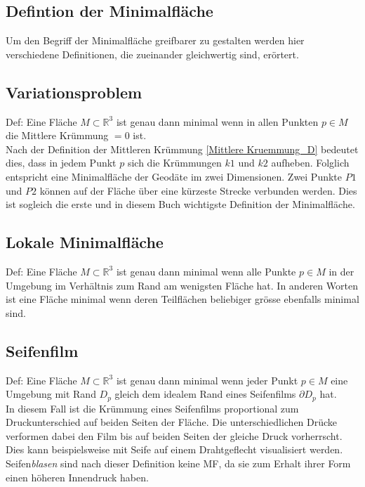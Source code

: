 \begin{refsection}
\section{Defintion der Minimalfläche}
Um den Begriff der Minimalfläche greifbarer zu gestalten werden hier verschiedene Definitionen, die zueinander gleichwertig sind, erörtert.

\subsection{Variationsproblem}\label{Variationsproblem}
Def: Eine Fläche $ \textit{M} \subset \mathbb{R}^{3} $ ist genau dann minimal wenn in allen Punkten $p \in M$ die Mittlere Krümmung $=0$ ist.\\
Nach der Definition der Mittleren Krümmung \eqref{Mittlere Kruemmung_D} bedeutet dies, dass in jedem Punkt $p$ sich die Krümmungen $k1$ und $k2$ aufheben.
Folglich entspricht eine Minimalfläche der Geodäte im zwei Dimensionen. Zwei Punkte $P1$ und $P2$ können auf der Fläche über eine kürzeste Strecke verbunden werden.  Dies ist sogleich die erste und in diesem Buch wichtigste Definition der Minimalfläche.

\subsection{Lokale Minimalfläche}\label{Lokale Minimalflaeche}

Def: Eine Fläche $M\subset\mathbb{R}^{3}$ ist genau dann minimal wenn alle Punkte $ p \in M $ in der Umgebung  im Verhältnis zum Rand am wenigsten Fläche hat.
In anderen Worten ist eine Fläche minimal wenn deren Teilflächen beliebiger grösse ebenfalls minimal sind.  

\subsection{Seifenfilm}\label{Seifenfilm}
Def: Eine Fläche $M\subset\mathbb{R}^{3}$ ist genau dann minimal wenn jeder Punkt $p \in M$ eine Umgebung mit Rand $D_p$ gleich dem idealem Rand eines Seifenfilms $\partial D_p$ hat.\\
In diesem Fall ist die Krümmung eines Seifenfilms proportional zum Druckunterschied auf beiden Seiten der Fläche. Die unterschiedlichen Drücke verformen dabei den Film bis auf beiden Seiten der gleiche Druck vorherrscht. Dies kann beispielsweise mit Seife auf einem Drahtgeflecht visualisiert werden. Seifen\textit{blasen} sind nach dieser Definition keine MF, da sie zum Erhalt ihrer Form einen höheren Innendruck haben.







\printbibliography[heading=subbibliography]
\end{refsection}